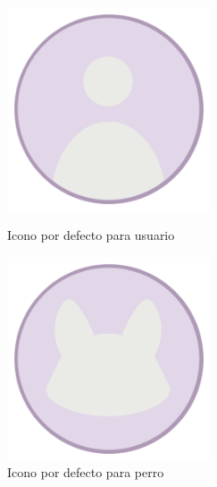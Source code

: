\documentclass[a4paper, 12pt]{article}
\begin{document}
\begin{figure}[H]
   	\begin{minipage}{0.48\textwidth}
		\begin{center}
			{\includegraphics[width=6cm]{EMPTYUSER.png}\par}
			\caption{Icono por defecto para usuario}
		\end{center}  
	\end{minipage}\hfill
   	\begin{minipage}{0.48\textwidth}
		\begin{center}
			{\includegraphics[width=6cm]{EMPTYDOG.png}\par}
			\caption{Icono por defecto para perro}
		\end{center}  
	\end{minipage}\hfill
\end{figure}
\end{document}
